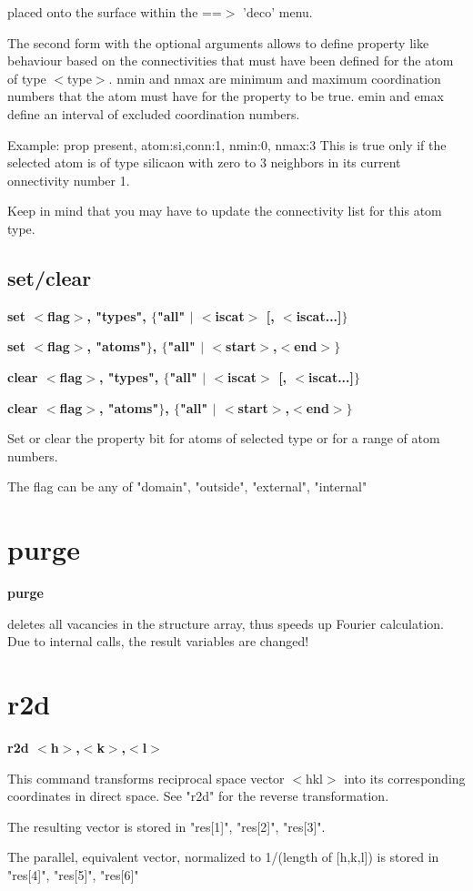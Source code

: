          placed onto the surface within the ==$> $ 'deco' menu. 
\par
The second form with the optional arguments allows to define 
property like behaviour based on the connectivities that must 
have been defined for the atom of type $ <$type$> $. 
nmin and nmax are minimum and maximum coordination numbers that the 
     atom must have for the property to be true. 
emin and emax define an interval of excluded coordination numbers. 
\par
Example: 
prop present, atom:si,conn:1, nmin:0, nmax:3 
This is true only if the selected atom is of type silicaon with 
zero to 3 neighbors in its current onnectivity number 1. 
\par
Keep in mind that you may have to update the connectivity 
list for this atom type. 
\subsection*{set/clear}
{\bf set   $ <$flag$> $, "types",  $ \{$"all" $| $ $ <$iscat$> $ [, $ <$iscat...]$\} $ \par }
{\bf set   $ <$flag$> $, "atoms"$\} $, $ \{$"all" $| $ $ <$start$> $,$ <$end$> $$\} $ \par }
{\bf clear $ <$flag$> $, "types",  $ \{$"all" $| $ $ <$iscat$> $ [, $ <$iscat...]$\} $ \par }
{\bf clear $ <$flag$> $, "atoms"$\} $, $ \{$"all" $| $ $ <$start$> $,$ <$end$> $$\} $ \par }
\par
\vspace{3pt}
Set or clear the property bit for atoms of selected type or 
for a range of atom numbers. 
\par
The flag can be any of "domain", "outside", "external", "internal" 
\section{purge}
{\bf purge \par }
\par
\vspace{3pt}
deletes all vacancies in the structure array, thus speeds up Fourier 
calculation. 
Due to internal calls, the result variables are changed! 
\section{r2d}
{\bf r2d $ <$h$> $,$ <$k$> $,$ <$l$> $ \par }
\par
\vspace{3pt}
This command transforms reciprocal space vector $ <$hkl$> $ into its corresponding 
coordinates in direct space. See "r2d" for the reverse transformation. 
\par
The resulting vector is stored in "res[1]", "res[2]", "res[3]". 
\par
The parallel, equivalent vector, normalized to 1/(length of [h,k,l]) 
is stored in "res[4]", "res[5]", "res[6]" 
